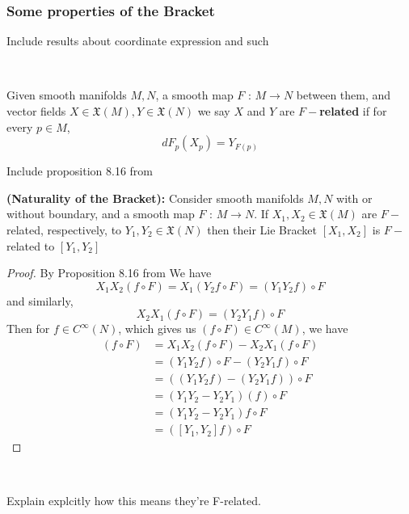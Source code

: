 \documentclass[11pt]{article}
\begin{document}
\subsubsection{Some properties of the Bracket}
\begin{note}
  {Include results about coordinate expression and such}
\end{note}
\\

\begin{bluebox}
  \begin{definition}
    Given smooth manifolds $M, N$, a smooth map $F \text{ : } M \rightarrow N$ between them, and vector fields $X \in \mathfrak{X}(M), Y \in \mathfrak{X}(N)$ we say $X$ and $Y$ are \textbf{$F-$related} if for every $p \in M$,
    \[ dF_{p}(X_p) = Y_{F(p)} \]
  \end{definition}
\end{bluebox}

\begin{note}
  {Include proposition 8.16 from \cite{LeeSM}}
\end{note}

\begin{redbox}
  \begin{theorem}
    \textbf{(Naturality of the Bracket):} Consider smooth manifolds $M, N$ with or without boundary, and a smooth map $F \text{ : } M \rightarrow N$. If $X_1, X_2 \in \mathfrak{X}(M)$ are $F-$related, respectively, to $Y_1, Y_2 \in \mathfrak{X}(N)$ then their Lie Bracket $[X_1, X_2]$ is $F-$related to $[Y_1, Y_2]$
  \end{theorem}
\end{redbox}
\begin{proof}
  By \color{red} Proposition 8.16 from \cite{LeeSM} \color{black} We have 
  \[ X_1 X_2 \left( f \circ F\right) = X_1 \left( Y_2f \circ F \right) = (Y_1 Y_2 f) \circ F \] and similarly,
  \[ X_2 X_1 \left(f \circ F\right) = (Y_2 Y_1 f) \circ F \]
  Then for $f \in C^{\infty}(N)$, which gives us $(f \circ F) \in C^{\infty}(M)$,  we have 
  \begin{align*}
    [X_1, X_2](f \circ F) &= X_1 X_2 (f \circ F) - X_2 X_1 (f \circ F) \\
    &= (Y_1 Y_2 f) \circ F - (Y_2 Y_1 f) \circ F \\
    &= \left((Y_1 Y_2 f) - (Y_2 Y_1 f) \right) \circ F \\
    &= \left(Y_1 Y_2 - Y_2 Y_1\right)(f) \circ F \\
    &= \left(Y_1 Y_2 - Y_2 Y_1 \right)f \circ F \\
    &= (\left[Y_1, Y_2\right]f) \circ F
  \end{align*}
\end{proof}
\\
\begin{note}
  {Explain explcitly how this means they're F-related.}
\end{note}
\end{document}
